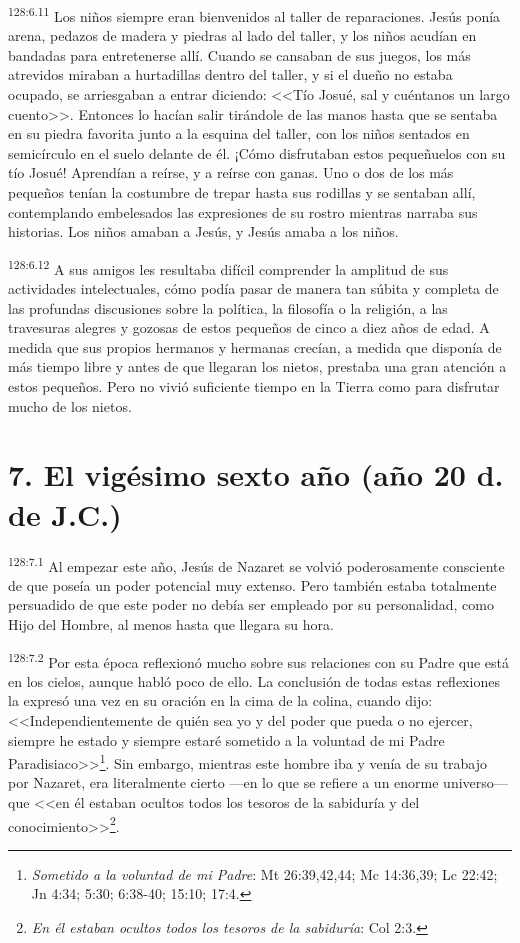 \par 
\textsuperscript{128:6.11} Los niños siempre eran bienvenidos al taller de reparaciones. Jesús ponía arena, pedazos de madera y piedras al lado del taller, y los niños acudían en bandadas para entretenerse allí. Cuando se cansaban de sus juegos, los más atrevidos miraban a hurtadillas dentro del taller, y si el dueño no estaba ocupado, se arriesgaban a entrar diciendo: <<Tío Josué, sal y cuéntanos un largo cuento>>. Entonces lo hacían salir tirándole de las manos hasta que se sentaba en su piedra favorita junto a la esquina del taller, con los niños sentados en semicírculo en el suelo delante de él. ¡Cómo disfrutaban estos pequeñuelos con su tío Josué! Aprendían a reírse, y a reírse con ganas. Uno o dos de los más pequeños tenían la costumbre de trepar hasta sus rodillas y se sentaban allí, contemplando embelesados las expresiones de su rostro mientras narraba sus historias. Los niños amaban a Jesús, y Jesús amaba a los niños.

\par 
\textsuperscript{128:6.12} A sus amigos les resultaba difícil comprender la amplitud de sus actividades intelectuales, cómo podía pasar de manera tan súbita y completa de las profundas discusiones sobre la política, la filosofía o la religión, a las travesuras alegres y gozosas de estos pequeños de cinco a diez años de edad. A medida que sus propios hermanos y hermanas crecían, a medida que disponía de más tiempo libre y antes de que llegaran los nietos, prestaba una gran atención a estos pequeños. Pero no vivió suficiente tiempo en la Tierra como para disfrutar mucho de los nietos.

\section*{7. El vigésimo sexto año (año 20 d. de J.C.)}
\par 
\textsuperscript{128:7.1} Al empezar este año, Jesús de Nazaret se volvió poderosamente consciente de que poseía un poder potencial muy extenso. Pero también estaba totalmente persuadido de que este poder no debía ser empleado por su personalidad, como Hijo del Hombre, al menos hasta que llegara su hora.

\par 
\textsuperscript{128:7.2} Por esta época reflexionó mucho sobre sus relaciones con su Padre que está en los cielos, aunque habló poco de ello. La conclusión de todas estas reflexiones la expresó una vez en su oración en la cima de la colina, cuando dijo: <<Independientemente de quién sea yo y del poder que pueda o no ejercer, siempre he estado y siempre estaré sometido a la voluntad de mi Padre Paradisiaco>>\footnote{\textit{Sometido a la voluntad de mi Padre}: Mt 26:39,42,44; Mc 14:36,39; Lc 22:42; Jn 4:34; 5:30; 6:38-40; 15:10; 17:4.}. Sin embargo, mientras este hombre iba y venía de su trabajo por Nazaret, era literalmente cierto ---en lo que se refiere a un enorme universo--- que <<en él estaban ocultos todos los tesoros de la sabiduría y del conocimiento>>\footnote{\textit{En él estaban ocultos todos los tesoros de la sabiduría}: Col 2:3.}.


